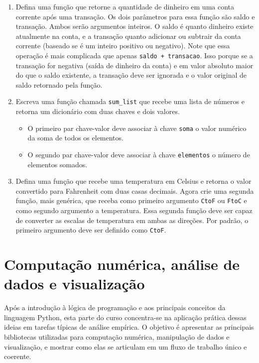 \documentclass[
  brazilian,
  letterpaper,
  DIV=11,
  numbers=noendperiod]{scrreprt}
\providecommand{\tightlist}{%
  \setlength{\itemsep}{0pt}\setlength{\parskip}{0pt}}
\begin{document}
\begin{enumerate}
\def\labelenumi{\arabic{enumi}.}
\setcounter{enumi}{1}
\item
  Defina uma função que retorne a quantidade de dinheiro em uma conta
  corrente após uma transação. Os dois parâmetros para essa função são
  saldo e transação. Ambos serão argumentos inteiros. O saldo é quanto
  dinheiro existe atualmente na conta, e a transação quanto adicionar ou
  subtrair da conta corrente (baseado se é um inteiro positivo ou
  negativo). Note que essa operação é mais complicada que apenas
  \texttt{saldo\ +\ transacao}. Isso porque se a transação for negativa
  (saída de dinheiro da conta) e em valor absoluto maior do que o saldo
  existente, a transação deve ser ignorada e o valor original de saldo
  retornado pela função.
\item
  Escreva uma função chamada \texttt{sum\_list} que recebe uma lista de
  números e retorna um dicionário com duas chaves e dois valores.

  \begin{itemize}
  \tightlist
  \item
    O primeiro par chave-valor deve associar à chave \texttt{soma} o
    valor numérico da soma de todos os elementos.
  \item
    O segundo par chave-valor deve associar à chave \texttt{elementos} o
    número de elementos somados.
  \end{itemize}
\item
  Defina uma função que recebe uma temperatura em Celsius e retorna o
  valor convertido para Fahrenheit com duas casas decimais. Agora crie
  uma segunda função, mais genérica, que receba como primeiro argumento
  \texttt{CtoF} ou \texttt{FtoC} e como segundo argumento a temperatura.
  Essa segunda função deve ser capaz de converter as escalas de
  temperatura em ambas as direções. Por padrão, o primeiro argumento
  deve ser definido como \texttt{CtoF}.
\end{enumerate}

\part{Computação numérica, análise de dados e visualização}

Após a introdução à lógica de programação e aos principais conceitos da
linguagem Python, esta parte do curso concentra-se na aplicação prática
dessas ideias em tarefas típicas de análise empírica. O objetivo é
apresentar as principais bibliotecas utilizadas para computação
numérica, manipulação de dados e visualização, e mostrar como elas se
articulam em um fluxo de trabalho único e coerente.
\end{document}

